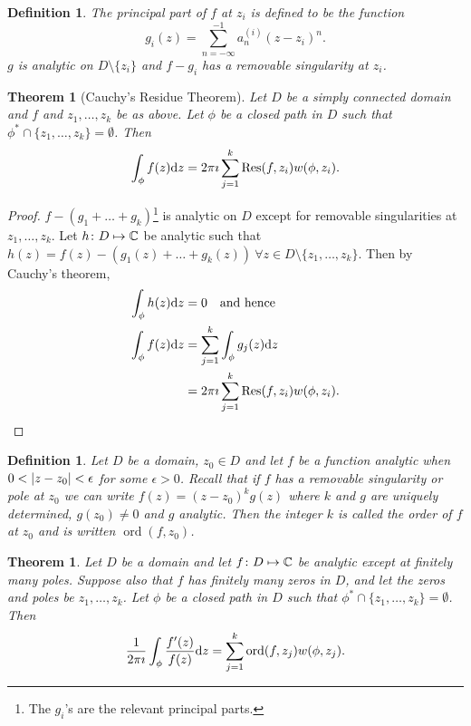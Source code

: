 \documentclass{notes}
\theoremstyle{plain}
\newtheorem{theorem}[proposition]{Theorem}
\newtheorem{definition}[proposition]{Definition}
\DeclareMathOperator{\Res}{Res}
\DeclareMathOperator{\ord}{ord}
\begin{document}
\begin{definition}
The principal part%
 of $f$ at $z_i$ is defined to be the function
\[
g_i(z) = \sum_{n=-\infty}^{-1} a_n^{(i)} (z-z_i)^n.
\]
$g$ is analytic on $D \setminus \{ z_i \}$ and $f - g_i$ has a removable
singularity at $z_i$.
\end{definition}

\begin{theorem}[Cauchy's Residue Theorem]%
Let $D$ be a simply connected domain and $f$ and $z_1, \dots, z_k$ be as above.
Let $\phi$ be a closed path in $D$ such that $\phi^* \cap \{ z_1, \dots, z_k \}
= \emptyset$.  Then
\[
\int_\phi f(z) \ud z = 2 \pi \imath \sum_{j=1}^k \Res(f,z_i) w(\phi,z_i).
\]
\end{theorem}

\begin{proof}
$f - (g_1 + \dots + g_k)$\footnote{The $g_i$'s are the relevant principal
parts.}
 is analytic on $D$ except for removable singularities
at $z_1, \dots, z_k$.  Let $h \colon D \mapsto \mathbb{C}$ be analytic such that
$h(z) = f(z) - (g_1(z) + \dots + g_k(z))\ \forall z \in D \setminus
\{ z_1, \dots, z_k \}$.  Then by Cauchy's theorem,
\begin{align*}
\int_\phi h(z) \ud z &= 0 \quad \text{and hence} \\
\int_\phi f(z) \ud z &= \sum_{j=1}^k \int_\phi g_j(z) \ud z \\
& = 2 \pi \imath \sum_{j=1}^k \Res(f,z_i) w(\phi,z_i).
\end{align*}
\end{proof}

\begin{definition}
Let $D$ be a domain, $z_0 \in D$ and let $f$ be a function analytic when
$0 < \left|z-z_0\right| < \epsilon$ for some $\epsilon > 0$.  Recall that if $f$ has
a removable singularity or pole at $z_0$ we can write
$f(z) = (z-z_0)^k g(z)$ where $k$ and $g$ are uniquely determined, $g(z_0) \neq
0$ and $g$ analytic.  Then the integer $k$ is called the order of
$f$ at $z_0$ and is written $\ord (f,z_0)$.
\end{definition}

\begin{theorem}%
Let $D$ be a domain and let $f \colon D \mapsto \mathbb{C}$ be analytic except at finitely
many poles.  Suppose also that $f$ has finitely many zeros in $D$, and let the
zeros and poles be $z_1, \dots, z_k$.  Let $\phi$ be a closed path in $D$ such
that $\phi^* \cap \{ z_1, \dots, z_k \} = \emptyset$.  Then
\[
\frac{1}{2 \pi \imath} \int_\phi \frac{f'(z)}{f(z)} \ud z =
\sum_{j=1}^k \ord (f,z_j) w(\phi,z_j).
\]
\end{theorem}
\end{document}
